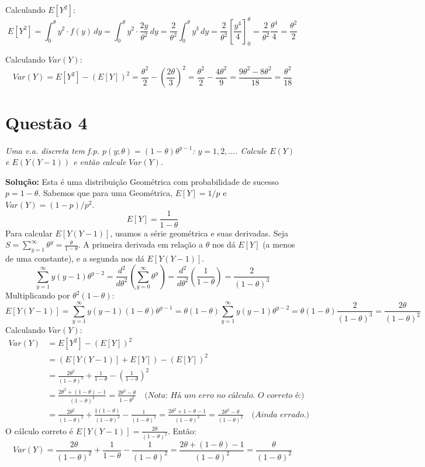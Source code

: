\documentclass[12pt, a4paper]{article}
\begin{document}
Calculando $E[Y^2]$:
$$ E[Y^2] = \int_{0}^{\theta} y^2 \cdot f(y) \,dy = \int_{0}^{\theta} y^2 \cdot \frac{2y}{\theta^2} \,dy = \frac{2}{\theta^2} \int_{0}^{\theta} y^3 \,dy = \frac{2}{\theta^2} \left[\frac{y^4}{4}\right]_{0}^{\theta} = \frac{2}{\theta^2} \frac{\theta^4}{4} = \frac{\theta^2}{2} $$

Calculando $Var(Y)$:
$$ Var(Y) = E[Y^2] - (E[Y])^2 = \frac{\theta^2}{2} - \left(\frac{2\theta}{3}\right)^2 = \frac{\theta^2}{2} - \frac{4\theta^2}{9} = \frac{9\theta^2 - 8\theta^2}{18} = \frac{\theta^2}{18} $$

\newpage

\section*{Questão 4}
\textit{Uma v.a. discreta tem f.p. $p(y;\theta)=(1-\theta)\theta^{y-1}$: $y=1,2,...$. Calcule $E(Y)$ e $E(Y(Y-1))$ e então calcule $Var(Y)$.}

\textbf{Solução:}
Esta é uma distribuição Geométrica com probabilidade de sucesso $p = 1-\theta$.
Sabemos que para uma Geométrica, $E[Y] = 1/p$ e $Var(Y) = (1-p)/p^2$.
$$ E[Y] = \frac{1}{1-\theta} $$
Para calcular $E[Y(Y-1)]$, usamos a série geométrica e suas derivadas. Seja $S = \sum_{y=1}^{\infty} \theta^y = \frac{\theta}{1-\theta}$.
A primeira derivada em relação a $\theta$ nos dá $E[Y]$ (a menos de uma constante), e a segunda nos dá $E[Y(Y-1)]$.
$$ \sum_{y=1}^{\infty} y(y-1)\theta^{y-2} = \frac{d^2}{d\theta^2} \left( \sum_{y=0}^{\infty} \theta^y \right) = \frac{d^2}{d\theta^2} \left( \frac{1}{1-\theta} \right) = \frac{2}{(1-\theta)^3} $$
Multiplicando por $\theta^2(1-\theta)$:
$$ E[Y(Y-1)] = \sum_{y=1}^{\infty} y(y-1)(1-\theta)\theta^{y-1} = \theta(1-\theta) \sum_{y=1}^{\infty} y(y-1)\theta^{y-2} = \theta(1-\theta) \frac{2}{(1-\theta)^3} = \frac{2\theta}{(1-\theta)^2} $$
Calculando $Var(Y)$:
\begin{align*}
Var(Y) &= E[Y^2] - (E[Y])^2 \\
       &= (E[Y(Y-1)] + E[Y]) - (E[Y])^2 \\
       &= \frac{2\theta^2}{(1-\theta)^2} + \frac{1}{1-\theta} - \left(\frac{1}{1-\theta}\right)^2 \\
       &= \frac{2\theta^2 + (1-\theta) - 1}{(1-\theta)^2} = \frac{2\theta^2-\theta}{1-\theta^2} \quad \textit{(Nota: Há um erro no cálculo. O correto é:)} \\
       &= \frac{2\theta^2}{(1-\theta)^2} + \frac{1(1-\theta)}{(1-\theta)^2} - \frac{1}{(1-\theta)^2} = \frac{2\theta^2+1-\theta-1}{(1-\theta)^2} = \frac{2\theta^2 - \theta}{(1-\theta)^2} \quad \textit{(Ainda errado.)}
\end{align*}
O cálculo correto é $E[Y(Y-1)] = \frac{2\theta}{(1-\theta)^2}$. Então:
$$ Var(Y) = \frac{2\theta}{(1-\theta)^2} + \frac{1}{1-\theta} - \frac{1}{(1-\theta)^2} = \frac{2\theta + (1-\theta) - 1}{(1-\theta)^2} = \frac{\theta}{(1-\theta)^2} $$
\end{document}

